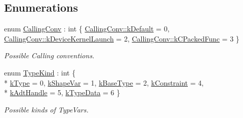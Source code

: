 \subsection*{Enumerations}
\begin{DoxyCompactItemize}
\item 
enum \hyperlink{namespacetvm_a85e4536ea4e1c8d3d48c61135f0a8ff0}{Calling\+Conv} \+: int \{ \hyperlink{namespacetvm_a85e4536ea4e1c8d3d48c61135f0a8ff0a6867faeaa475fda467e48267db2bb8a8}{Calling\+Conv\+::k\+Default} = 0, 
\hyperlink{namespacetvm_a85e4536ea4e1c8d3d48c61135f0a8ff0aea7c0ea92da6200bb14ea17a6094e2bc}{Calling\+Conv\+::k\+Device\+Kernel\+Launch} = 2, 
\hyperlink{namespacetvm_a85e4536ea4e1c8d3d48c61135f0a8ff0ae7694043e4825265becdb58550b4e443}{Calling\+Conv\+::k\+C\+Packed\+Func} = 3
 \}\begin{DoxyCompactList}\small\item\em Possible Calling conventions. \end{DoxyCompactList}
\item 
enum \hyperlink{namespacetvm_acd267f8d7f55da6ac681239831963279}{Type\+Kind} \+: int \{ \\*
\hyperlink{namespacetvm_acd267f8d7f55da6ac681239831963279a46f081c7ea2307c83d3cdfd42e1583f7}{k\+Type} = 0, 
\hyperlink{namespacetvm_acd267f8d7f55da6ac681239831963279ad7d44c9f700aa20bcc455c6d9ee4ff18}{k\+Shape\+Var} = 1, 
\hyperlink{namespacetvm_acd267f8d7f55da6ac681239831963279a86ff765603911600b938cea9a65e984b}{k\+Base\+Type} = 2, 
\hyperlink{namespacetvm_acd267f8d7f55da6ac681239831963279a9496d61badd19161ce92108f06903606}{k\+Constraint} = 4, 
\\*
\hyperlink{namespacetvm_acd267f8d7f55da6ac681239831963279ab6bf8f8bef54e7ebbc8d9f804e94421e}{k\+Adt\+Handle} = 5, 
\hyperlink{namespacetvm_acd267f8d7f55da6ac681239831963279a8b02b25ecd96ab7f18ace5aa18f832ba}{k\+Type\+Data} = 6
 \}\begin{DoxyCompactList}\small\item\em Possible kinds of Type\+Vars. \end{DoxyCompactList}
\end{DoxyCompactItemize}
